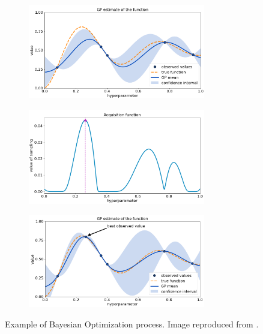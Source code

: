 \begin{figure}[htbp!] %
  \centering
  \begin{subfigure}[b]{0.49\textwidth}
    \centering
    \includegraphics[width=0.85\textwidth]{figures/BO-GP-1}
    \caption{}
  \end{subfigure}
  \hfill
  \begin{subfigure}[b]{0.49\textwidth}
    \centering
    \includegraphics[width=0.85\textwidth]{figures/BO-GP-2}
    \caption{}
  \end{subfigure}
  \par
  \begin{subfigure}[b]{0.49\textwidth}
    \centering
    \includegraphics[width=0.85\textwidth]{figures/BO-GP-3}
    \caption{}
  \end{subfigure}
  \caption{Example of Bayesian Optimization process. Image reproduced from \cite{ravikumar_lets_2018}.}
  \label{fig:3-bo}
\end{figure}

